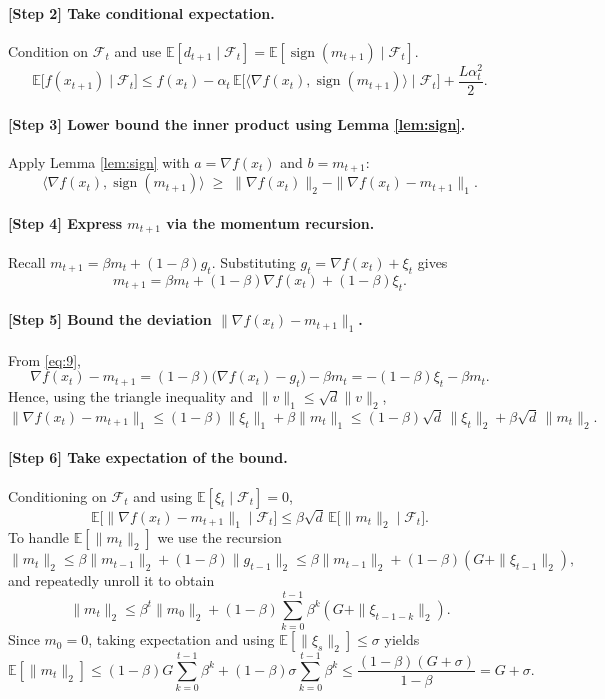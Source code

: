 \documentclass{article}
\newcommand{\E}{\mathbb{E}}
\begin{document}
\paragraph{[Step 2] Take conditional expectation.}
Condition on $\mathcal{F}_t$ and use $\E[d_{t+1}\mid\mathcal{F}_t]=\E[\operatorname{sign}(m_{t+1})\mid\mathcal{F}_t]$.
\[
\E\!\big[f(x_{t+1})\mid\mathcal{F}_t\big]
\le f(x_t)-\alpha_t\,\E\!\big[\langle\nabla f(x_t),\operatorname{sign}(m_{t+1})\rangle\mid\mathcal{F}_t\big]
+\frac{L\alpha_t^{2}}{2}.
\tag{7}
\]

\paragraph{[Step 3] Lower bound the inner product using Lemma \ref{lem:sign}.}
Apply Lemma \ref{lem:sign} with $a=\nabla f(x_t)$ and $b=m_{t+1}$:
\[
\langle\nabla f(x_t),\operatorname{sign}(m_{t+1})\rangle
\;\ge\;
\|\nabla f(x_t)\|_{2}
-\|\nabla f(x_t)-m_{t+1}\|_{1}.
\tag{8}
\]

\paragraph{[Step 4] Express $m_{t+1}$ via the momentum recursion.}
Recall $m_{t+1}= \beta m_t+(1-\beta)g_t$. Substituting $g_t=\nabla f(x_t)+\xi_t$ gives
\[
m_{t+1}= \beta m_t+(1-\beta)\nabla f(x_t)+(1-\beta)\xi_t.
\tag{9}
\]

\paragraph{[Step 5] Bound the deviation $\|\nabla f(x_t)-m_{t+1}\|_{1}$.}
From \eqref{eq:9},
\[
\nabla f(x_t)-m_{t+1}
= (1-\beta)\big(\nabla f(x_t)-g_t\big)-\beta m_t
= -(1-\beta)\xi_t-\beta m_t .
\]
Hence, using the triangle inequality and $\|v\|_{1}\le\sqrt{d}\|v\|_{2}$,
\[
\|\nabla f(x_t)-m_{t+1}\|_{1}
\le (1-\beta)\|\xi_t\|_{1}+\beta\|m_t\|_{1}
\le (1-\beta)\sqrt{d}\,\|\xi_t\|_{2}+\beta\sqrt{d}\,\|m_t\|_{2}.
\tag{10}
\]

\paragraph{[Step 6] Take expectation of the bound.}
Conditioning on $\mathcal{F}_t$ and using $\E[\xi_t\mid\mathcal{F}_t]=0$,
\[
\E\!\big[\|\nabla f(x_t)-m_{t+1}\|_{1}\mid\mathcal{F}_t\big]
\le \beta\sqrt{d}\,\E\!\big[\|m_t\|_{2}\mid\mathcal{F}_t\big].
\tag{11}
\]
To handle $\E[\|m_t\|_{2}]$ we use the recursion
\[
\|m_{t}\|_{2}
\le \beta\|m_{t-1}\|_{2}+(1-\beta)\|g_{t-1}\|_{2}
\le \beta\|m_{t-1}\|_{2}+(1-\beta)(G+\|\xi_{t-1}\|_{2}),
\]
and repeatedly unroll it to obtain
\[
\|m_{t}\|_{2}\le \beta^{t}\|m_{0}\|_{2}+(1-\beta)\sum_{k=0}^{t-1}\beta^{k}(G+\|\xi_{t-1-k}\|_{2}).
\tag{12}
\]
Since $m_0=0$, taking expectation and using $\E[\|\xi_{s}\|_{2}]\le\sigma$ yields
\[
\E[\|m_{t}\|_{2}]
\le (1-\beta)G\sum_{k=0}^{t-1}\beta^{k}+(1-\beta)\sigma\sum_{k=0}^{t-1}\beta^{k}
\le \frac{(1-\beta)(G+\sigma)}{1-\beta}=G+\sigma .
\tag{13}
\]
\end{document}
